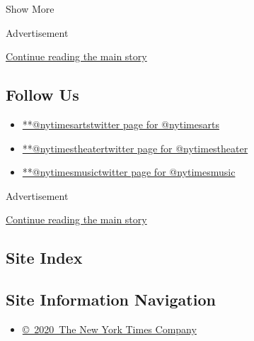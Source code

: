 Show More

Advertisement

\protect\hyperlink{after-mid2}{Continue reading the main story}

\hypertarget{follow-us}{%
\subsection{Follow Us}\label{follow-us}}

\begin{itemize}
\tightlist
\item
  \href{https://twitter.com/nytimesarts}{**@nytimesartstwitter page for
  @nytimesarts}
\item
  \href{https://twitter.com/nytimestheater}{**@nytimestheatertwitter
  page for @nytimestheater}
\item
  \href{https://twitter.com/nytimesmusic}{**@nytimesmusictwitter page
  for @nytimesmusic}
\end{itemize}

Advertisement

\protect\hyperlink{after-mktg}{Continue reading the main story}

\hypertarget{site-index}{%
\subsection{Site Index}\label{site-index}}

\hypertarget{site-information-navigation}{%
\subsection{Site Information
Navigation}\label{site-information-navigation}}

\begin{itemize}
\tightlist
\item
  \href{https://help.nytimes.com/hc/en-us/articles/115014792127-Copyright-notice}{©~2020~The
  New York Times Company}
\end{itemize}

